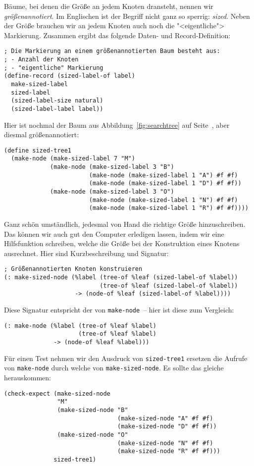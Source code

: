 Bäume, bei denen die Größe an jedem Knoten dransteht, nennen wir
\textit{größenannotiert}.  Im Englischen ist der Begriff
nicht ganz so sperrig: \textit{sized}.  Neben der Größe brauchen wir
an jedem Knoten auch noch die "<eigentliche"> Markierung.  Zusammen
ergibt das folgende Daten- und Record-Definition:
%
\begin{lstlisting}
; Die Markierung an einem größenannotierten Baum besteht aus:
; - Anzahl der Knoten
; - "eigentliche" Markierung
(define-record (sized-label-of label)
  make-sized-label
  sized-label
  (sized-label-size natural)
  (sized-label-label label))
\end{lstlisting}
%
Hier ist nochmal der Baum aus Abbildung~\ref{fig:searchtree} auf
Seite~\pageref{fig:searchtree}, aber diesmal größenannotiert:
%
\begin{lstlisting}
(define sized-tree1
  (make-node (make-sized-label 7 "M")
             (make-node (make-sized-label 3 "B")
                        (make-node (make-sized-label 1 "A") #f #f)
                        (make-node (make-sized-label 1 "D") #f #f))
             (make-node (make-sized-label 3 "O")
                        (make-node (make-sized-label 1 "N") #f #f)
                        (make-node (make-sized-label 1 "R") #f #f))))
\end{lstlisting}
%
Ganz schön umständlich, jedesmal von Hand die richtige Größe
hinzuschreiben.  Das können wir auch gut den Computer erledigen
lassen, indem wir eine Hilfsfunktion schreiben, welche die Größe bei
der Konstruktion eines Knotens ausrechnet.  Hier sind Kurzbeschreibung
und Signatur:
%
\begin{lstlisting}
; Größenannotierten Knoten konstruieren
(: make-sized-node (%label (tree-of %leaf (sized-label-of %label))
                           (tree-of %leaf (sized-label-of %label))
                    -> (node-of %leaf (sized-label-of %label))))
\end{lstlisting}
%
Diese Signatur entspricht der von \lstinline{make-node}~-- hier ist
diese zum Vergleich:
%
\begin{lstlisting}
(: make-node (%label (tree-of %leaf %label)
                     (tree-of %leaf %label)
              -> (node-of %leaf %label)))
\end{lstlisting}
%
Für einen Test nehmen wir den Ausdruck von \lstinline{sized-tree1}
ersetzen die Aufrufe von \lstinline{make-node} durch welche von
\lstinline{make-sized-node}.  Es sollte das gleiche herauskommen:
%
\begin{lstlisting}
(check-expect (make-sized-node
               "M"
               (make-sized-node "B"
                                (make-sized-node "A" #f #f)
                                (make-sized-node "D" #f #f))
               (make-sized-node "O"
                                (make-sized-node "N" #f #f)
                                (make-sized-node "R" #f #f)))
              sized-tree1)
\end{lstlisting}
